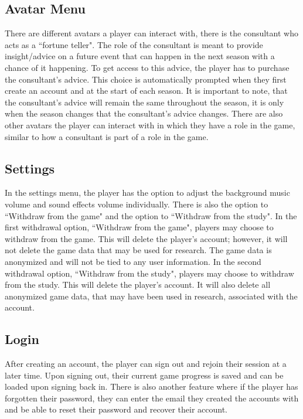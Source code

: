 \documentclass{article}
\begin{document}
\subsection{Avatar Menu}
There are different avatars a player can interact with, there is the consultant who acts as a ``fortune teller". The role of the consultant is meant to provide insight/advice on a future event that can happen in the next season with a chance of it happening. To get access to this advice, the player has to purchase the consultant's advice. This choice is automatically prompted when they first create an account and at the start of each season. It is important to note, that the consultant's advice will remain the same throughout the season, it is only when the season changes that the consultant's advice changes. There are also other avatars the player can interact with in which they have a role in the game, similar to how a consultant is part of a role in the game. 

\subsection{Settings}
In the settings menu, the player has the option to adjust the background music volume and sound effects volume individually. There is also the option to ``Withdraw from the game" and the option to ``Withdraw from the study". In the first withdrawal option,  ``Withdraw from the game", players may choose to withdraw from the game. This will delete the player's account; however, it will not delete the game data that may be used for research. The game data is anonymized and will not be tied to any user information. In the second withdrawal option, ``Withdraw from the study", players may choose to withdraw from the study. This will delete the player's account. It will also delete all anonymized game data, that may have been used in research, associated with the account.

\subsection{Login}
After creating an account, the player can sign out and rejoin their session at a later time. Upon signing out, their current game progress is saved and can be loaded upon signing back in. There is also another feature where if the player has forgotten their password, they can enter the email they created the accounts with and be able to reset their password and recover their account.
\end{document}
